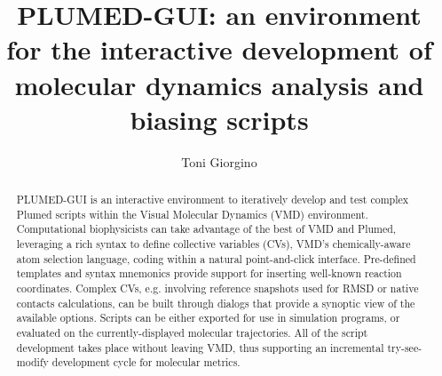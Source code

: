 \documentclass[preprint,review,11pt]{elsarticle}
\newcommand{\mytitle}{PLUMED-GUI: an environment for the interactive development 
  of molecular dynamics analysis and biasing scripts}
\begin{document}
\begin{frontmatter}


\title{\mytitle}
\author{Toni Giorgino}
\address{Institute of Biomedical Engineering (ISIB),\\ 
National Research Council of Italy (CNR),\\
Padua, Italy}




\begin{abstract}
  PLUMED-GUI is an interactive environment to iteratively develop and
  test complex Plumed scripts within the Visual Molecular Dynamics
  (VMD) environment. Computational biophysicists can take advantage of
  the best of VMD and Plumed, leveraging a rich syntax to define
  collective variables (CVs), VMD's chemically-aware atom selection
  language, coding within a natural point-and-click interface.
  Pre-defined templates and syntax mnemonics provide support for
  inserting well-known reaction coordinates. Complex CVs,
  e.g. involving reference snapshots used for RMSD or native contacts
  calculations, can be built through dialogs that provide a synoptic
  view of the available options.  Scripts can be either exported for
  use in simulation programs, or evaluated on the currently-displayed
  molecular trajectories. All of the script development takes place
  without leaving VMD, thus supporting an incremental try-see-modify
  development cycle for molecular metrics.
\end{abstract}


\end{frontmatter}
\end{document}
